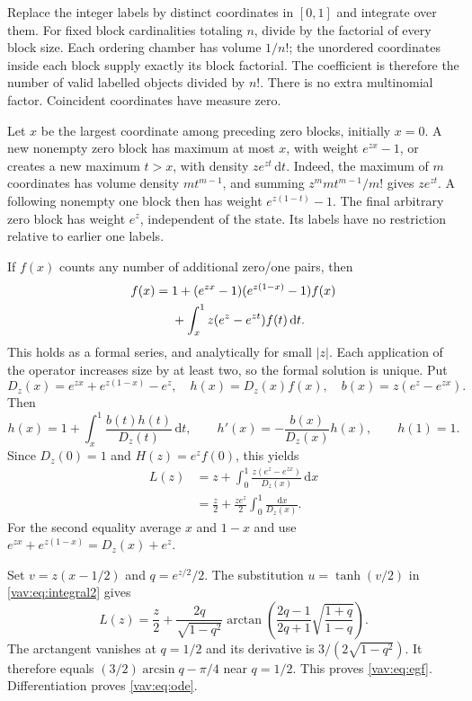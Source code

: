 \documentclass[11pt]{article}
\theoremstyle{remark}\newtheorem{remark}[theorem]{Remark}
\newcommand{\dd}{\,\mathrm d}
\begin{document}
Replace the integer labels by distinct coordinates in $[0,1]$ and
integrate over them. For fixed block cardinalities totaling $n$, divide
by the factorial of every block size. Each ordering chamber has volume
$1/n!$; the unordered coordinates inside each block supply exactly its
block factorial. The coefficient is therefore the number of valid
labelled objects divided by $n!$. There is no extra multinomial factor.
Coincident coordinates have measure zero.

Let $x$ be the largest coordinate among preceding zero blocks, initially
$x=0$. A new nonempty zero block has maximum at most $x$, with weight
$e^{zx}-1$, or creates a new maximum $t>x$, with density
$ze^{zt}\dd t$. Indeed, the maximum of $m$ coordinates has volume
density $mt^{m-1}$, and summing $z^mmt^{m-1}/m!$ gives $ze^{zt}$.
A following nonempty one block then has weight $e^{z(1-t)}-1$.
The final arbitrary zero block has weight $e^z$, independent of the
state. Its labels have no restriction relative to earlier one labels.

If $f(x)$ counts any number of additional zero/one pairs, then
\begin{align}
 f(x)={}&1+(e^{zx}-1)(e^{z(1-x)}-1)f(x)\notag\\
 &+\int_x^1 z(e^z-e^{zt})f(t)\dd t.\label{vav:eq:transfer}
\end{align}
This holds as a formal series, and analytically for small $|z|$.
Each application of the operator increases size by at least two, so the
formal solution is unique. Put
\[
 D_z(x)=e^{zx}+e^{z(1-x)}-e^z,\quad
 h(x)=D_z(x)f(x),\quad b(x)=z(e^z-e^{zx}).
\]
Then
\[
 h(x)=1+\int_x^1\frac{b(t)h(t)}{D_z(t)}\dd t,
 \qquad h'(x)=-\frac{b(x)}{D_z(x)}h(x),\qquad h(1)=1.
\]
Since $D_z(0)=1$ and $H(z)=e^zf(0)$, this yields
\begin{align}
 L(z)&=z+\int_0^1\frac{z(e^z-e^{zx})}{D_z(x)}\dd x\label{vav:eq:integral1}\\
 &=\frac z2+\frac{ze^z}{2}\int_0^1\frac{\dd x}{D_z(x)}.
 \label{vav:eq:integral2}
\end{align}
For the second equality average $x$ and $1-x$ and use
$e^{zx}+e^{z(1-x)}=D_z(x)+e^z$.

Set $v=z(x-1/2)$ and $q=e^{z/2}/2$. The substitution
$u=\tanh(v/2)$ in \eqref{vav:eq:integral2} gives
\begin{equation}\label{vav:eq:atan}
 L(z)=\frac z2+\frac{2q}{\sqrt{1-q^2}}
 \arctan\left(\frac{2q-1}{2q+1}\sqrt{\frac{1+q}{1-q}}\right).
\end{equation}
The arctangent vanishes at $q=1/2$ and its derivative is
$3/(2\sqrt{1-q^2})$. It therefore equals
$(3/2)\arcsin q-\pi/4$ near $q=1/2$.
This proves \eqref{vav:eq:egf}. Differentiation proves \eqref{vav:eq:ode}.
\end{document}
